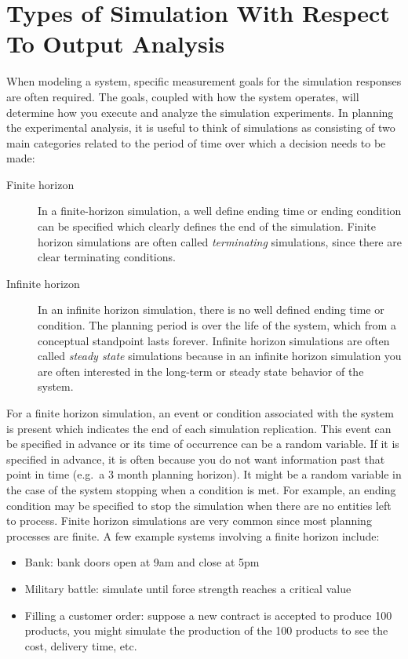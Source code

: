 \documentclass[
]{book}
\theoremstyle{definition}
\theoremstyle{definition}
\theoremstyle{definition}
\theoremstyle{definition}
\theoremstyle{remark}
\begin{document}
\hypertarget{simoa:simtypes}{%
\section{Types of Simulation With Respect To Output Analysis}\label{simoa:simtypes}}

When modeling a system, specific measurement goals for the simulation
responses are often required. The goals, coupled with how the system
operates, will determine how you execute and analyze the simulation
experiments. In planning the experimental analysis, it is useful to
think of simulations as consisting of two main categories related to the
period of time over which a decision needs to be made:

\begin{description}
\item[Finite horizon]
In a finite-horizon simulation, a well define ending time or ending
condition can be specified which clearly defines the end of the
simulation. Finite horizon simulations are often called
\emph{terminating} simulations, since there are clear terminating
conditions.
\item[Infinite horizon]
In an infinite horizon simulation, there is no well defined ending
time or condition. The planning period is over the life of the
system, which from a conceptual standpoint lasts forever. Infinite
horizon simulations are often called \emph{steady state} simulations
because in an infinite horizon simulation you are often interested
in the long-term or steady state behavior of the system.
\end{description}

For a finite horizon simulation, an event or condition associated with
the system is present which indicates the end of each simulation
replication. This event can be specified in advance or its time of
occurrence can be a random variable. If it is specified in advance, it
is often because you do not want information past that point in time
(e.g.~a 3 month planning horizon). It might be a random variable in the
case of the system stopping when a condition is met. For example, an
ending condition may be specified to stop the simulation when there are
no entities left to process. Finite horizon simulations are very common
since most planning processes are finite. A few example systems
involving a finite horizon include:

\begin{itemize}
\item
  Bank: bank doors open at 9am and close at 5pm
\item
  Military battle: simulate until force strength reaches a critical
  value
\item
  Filling a customer order: suppose a new contract is accepted to
  produce 100 products, you might simulate the production of the 100
  products to see the cost, delivery time, etc.
\end{itemize}
\end{document}
